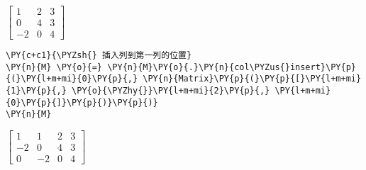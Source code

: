             
    
    $\displaystyle \left[\begin{matrix}1 & 2 & 3\\0 & 4 & 3\\-2 & 0 & 4\end{matrix}\right]$

    

    \begin{tcolorbox}[breakable, size=fbox, boxrule=1pt, pad at break*=1mm,colback=cellbackground, colframe=cellborder]
\begin{Verbatim}[commandchars=\\\{\}]
\PY{c+c1}{\PYZsh{} 插入列到第一列的位置}
\PY{n}{M} \PY{o}{=} \PY{n}{M}\PY{o}{.}\PY{n}{col\PYZus{}insert}\PY{p}{(}\PY{l+m+mi}{0}\PY{p}{,} \PY{n}{Matrix}\PY{p}{(}\PY{p}{[}\PY{l+m+mi}{1}\PY{p}{,} \PY{o}{\PYZhy{}}\PY{l+m+mi}{2}\PY{p}{,} \PY{l+m+mi}{0}\PY{p}{]}\PY{p}{)}\PY{p}{)}
\PY{n}{M}
\end{Verbatim}
\end{tcolorbox}
 
            
    
    $\displaystyle \left[\begin{matrix}1 & 1 & 2 & 3\\-2 & 0 & 4 & 3\\0 & -2 & 0 & 4\end{matrix}\right]$
